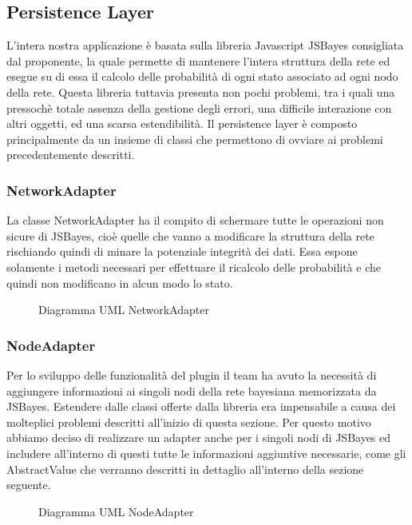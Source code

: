 \subsection{Persistence Layer}
L'intera nostra applicazione è basata sulla libreria Javascript JSBayes consigliata dal proponente, la quale permette di mantenere l'intera struttura della rete ed esegue su di essa il calcolo delle probabilità di ogni stato associato ad ogni nodo della rete.
Questa libreria tuttavia presenta non pochi problemi, tra i quali una pressochè totale assenza della gestione degli errori, una difficile interazione con altri oggetti, ed una scarsa estendibilità.
Il persistence layer è composto principalmente da un insieme di classi che permettono di ovviare ai problemi precedentemente descritti.
\subsubsection{NetworkAdapter}
La classe NetworkAdapter ha il compito di schermare tutte le operazioni non sicure di JSBayes, cioè quelle che vanno a modificare la struttura della rete rischiando quindi di minare la potenziale integrità dei dati.
Essa espone solamente i metodi necessari per effettuare il ricalcolo delle probabilità e che quindi non modificano in alcun modo lo stato.
\begin{figure} [H]
	\centering

	\caption{Diagramma UML NetworkAdapter}\label{}
\end{figure}
\subsubsection{NodeAdapter}
Per lo sviluppo delle funzionalità del plugin il team ha avuto la necessità di aggiungere informazioni ai singoli nodi della rete bayesiana memorizzata da JSBayes.
Estendere dalle classi offerte dalla libreria era impensabile a causa dei molteplici problemi descritti all'inizio di questa sezione. Per questo motivo abbiamo deciso di realizzare un adapter anche per i singoli nodi di JSBayes ed includere all'interno di questi tutte le informazioni aggiuntive necessarie, come gli AbstractValue che verranno descritti in dettaglio all'interno della sezione seguente.
\begin{figure} [H]
	\centering
	
	\caption{Diagramma UML NodeAdapter}\label{}
\end{figure}
